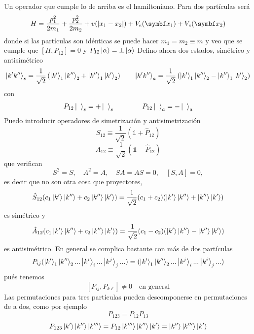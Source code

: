 \documentclass[10pt,oneside]{CBFT_book}
\begin{document}
Un operador que cumple lo de arriba es el hamiltoniano.
Para dos partículas será 
\[
	H = \frac{p_1^2}{2m_1} + \frac{p_2^2}{2m_2} + v(|x_1 - x_2|) + V_e(\vb{x}_1)+ V_e(\vb{x}_2)
\]
donde si las partículas son idénticas se puede hacer $m_1=m_2\equiv m$ y veo que se cumple que
$ [ H, P_{12} ] = 0 $ y $ P_{12} \Ket{\alpha} = \pm \Ket{\alpha} $
Defino ahora dos estados, simétrico y antisimétrico
\[
	\Ket{k' k''}_s = \frac{1}{\sqrt{2}}\left( \Ket{k'}_1\Ket{k''}_2 + \Ket{k''}_1\Ket{k'}_2 \right) \qquad 
	\Ket{k' k''}_a = \frac{1}{\sqrt{2}}\left( \Ket{k'}_1\Ket{k''}_2 - \Ket{k''}_1\Ket{k'}_2 \right)
\]
con 
\[
	P_{12}\Ket{\phantom{k}}_s = + \Ket{\phantom{k}}_s \qquad \qquad 
	P_{12}\Ket{\phantom{k}}_a = - \Ket{\phantom{k}}_a
\]
Puedo introducir operadores de simetrización y antisimetrización 
\[
	\hat{S}_{12} \equiv \frac{1}{\sqrt{2}} \left( \mathbb{1} + \hat{P}_{12} \right)
\]
\[
	\hat{A}_{12} \equiv \frac{1}{\sqrt{2}} \left( \mathbb{1} - \hat{P}_{12} \right)
\]
que verifican 
\[
	S^2 = S, \quad  A^2= A, \quad SA=AS=0, \quad [S,A] = 0,
\]
es decir que no son otra cosa que proyectores, 
\[
	\hat{S}_{12} (c_1\Ket{k'}\Ket{k''} + c_2\Ket{k''}\Ket{k'} ) = \frac{1}{\sqrt{2}}(c_1+c_2)
	(\Ket{k'}\Ket{k''} + \Ket{k''}\Ket{k'} )
\]
es simétrico y 
\[
	\hat{A}_{12} (c_1\Ket{k'}\Ket{k''} + c_2\Ket{k''}\Ket{k'} ) = \frac{1}{\sqrt{2}}(c_1-c_2)
	(\Ket{k'}\Ket{k''} - \Ket{k''}\Ket{k'} )
\]
es antisimétrico.
En general se complica bastante con más de dos partículas 
\[
	P_{ij}(\Ket{k'}_1\Ket{k''}_2...\Ket{k^i}_i...\Ket{k^j}_j...) =
	(\Ket{k'}_1\Ket{k''}_2...\Ket{k^j}_i...\Ket{k^i}_j...)
\]
pués tenemos 
\[
	[P_{ij},P_{k\ell}] \neq 0 \quad \text{en general}
\]
Las permutaciones para tres partículas pueden descomponerse en permutaciones de a dos,
como por ejemplo
\[
	P_{123} = P_{12}P_{13} 
\]
\[
	P_{123}\Ket{k'}\Ket{k''}\Ket{k'''} = P_{12}\Ket{k'''}\Ket{k''}\Ket{k'} = \Ket{k''}\Ket{k'''}\Ket{k'}
\]
\end{document}
